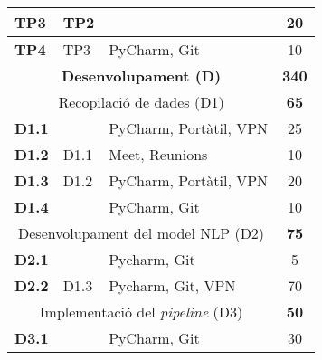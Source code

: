 {{\begin{table}[H]
\begin{tabular}{|cllc|}
    \multicolumn{1}{|l|}{\textbf{TP3}}          & \multicolumn{1}{l|}{TP2}                      & \multicolumn{1}{l|}{}               & 20                       \\ \hline
    \multicolumn{1}{|l|}{\textbf{TP4}}          & \multicolumn{1}{l|}{TP3}                      & \multicolumn{1}{l|}{PyCharm, Git}   & 10                       \\ \hline
    \hline
    \multicolumn{3}{|c|}{\textbf{Desenvolupament (D)}}                                  & \textbf{340}             \\ \hline
                                                \multicolumn{3}{|c|}{Recopilació de dades (D1)}                                     & \textbf{65}              \\ \hline
    \multicolumn{1}{|l|}{\textbf{D1.1}}         & \multicolumn{1}{l|}{}                      & \multicolumn{1}{l|}{PyCharm, Portàtil, VPN} & 25                       \\ \hline
    \multicolumn{1}{|l|}{\textbf{D1.2}}         & \multicolumn{1}{l|}{D1.1}                      & \multicolumn{1}{l|}{Meet, Reunions}    & 10                       \\ \hline
    \multicolumn{1}{|l|}{\textbf{D1.3}}         & \multicolumn{1}{l|}{D1.2}                      & \multicolumn{1}{l|}{PyCharm, Portàtil, VPN}    & 20                       \\ \hline
    \multicolumn{1}{|l|}{\textbf{D1.4}}         & \multicolumn{1}{l|}{}                      & \multicolumn{1}{l|}{PyCharm, Git}    & 10                       \\ \hline
                                                \multicolumn{3}{|c|}{Desenvolupament del model NLP (D2)}                            & \textbf{75}              \\ \hline
    \multicolumn{1}{|l|}{\textbf{D2.1}}         & \multicolumn{1}{l|}{}                      & \multicolumn{1}{l|}{Pycharm, Git}   & 5                        \\ \hline
    \multicolumn{1}{|l|}{\textbf{D2.2}}         & \multicolumn{1}{l|}{D1.3}                      & \multicolumn{1}{l|}{Pycharm, Git, VPN} & 70                       \\ \hline
                                                \multicolumn{3}{|c|}{Implementació del \textit{pipeline} (D3)}         & \textbf{50}              \\ \hline
    \multicolumn{1}{|l|}{\textbf{D3.1}}         & \multicolumn{1}{l|}{}                      & \multicolumn{1}{l|}{PyCharm, Git}              & 30                       \\ \hline

\end{tabular}
\end{table}}}
